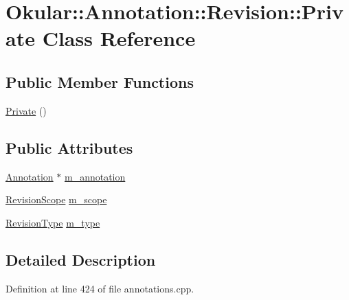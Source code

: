 \hypertarget{classAnnotation_1_1Revision_1_1Private}{\section{Okular\+:\+:Annotation\+:\+:Revision\+:\+:Private Class Reference}
\label{classAnnotation_1_1Revision_1_1Private}
}
\subsection*{Public Member Functions}
\begin{DoxyCompactItemize}
\item 
\hyperlink{classAnnotation_1_1Revision_1_1Private_a84d8bae082746706a024f7d56ad281f1}{Private} ()
\end{DoxyCompactItemize}
\subsection*{Public Attributes}
\begin{DoxyCompactItemize}
\item 
\hyperlink{classOkular_1_1Annotation}{Annotation} $\ast$ \hyperlink{classAnnotation_1_1Revision_1_1Private_a007aa928e40c95397445d577077d8328}{m\+\_\+annotation}
\item 
\hyperlink{classOkular_1_1Annotation_a9f71f811fcd4d3524e199e7eee4b6390}{Revision\+Scope} \hyperlink{classAnnotation_1_1Revision_1_1Private_aac1b9a60c31ba65a3301b3bf8a8c4d0f}{m\+\_\+scope}
\item 
\hyperlink{classOkular_1_1Annotation_a76de7f3bda49c63bd319763c6ac46bd3}{Revision\+Type} \hyperlink{classAnnotation_1_1Revision_1_1Private_a2cea518ec5656c3a4e48d18d40bcf7b5}{m\+\_\+type}
\end{DoxyCompactItemize}


\subsection{Detailed Description}


Definition at line 424 of file annotations.\+cpp.



